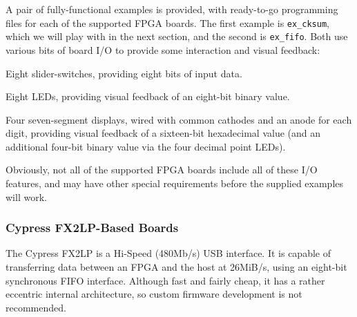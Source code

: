 A pair of fully-functional examples is provided, with ready-to-go programming files for each of the supported FPGA boards. The first example is \texttt{ex\_cksum}, which we will play with in the next section, and the second is \texttt{ex\_fifo}. Both use various bits of board I/O to provide some interaction and visual feedback:

\begin{blobs}
  \item
    Eight slider-switches, providing eight bits of input data.
  \item
    Eight LEDs, providing visual feedback of an eight-bit binary value.
  \item
    Four seven-segment displays, wired with common cathodes and an anode for each digit, providing visual feedback of a sixteen-bit hexadecimal value (and an additional four-bit binary value via the four decimal point LEDs).
\end{blobs}

Obviously, not all of the supported FPGA boards include all of these I/O features, and may have other special requirements before the supplied examples will work.

\subsubsection{Cypress FX2LP-Based Boards}

The Cypress FX2LP is a Hi-Speed (480Mb/s) USB interface. It is capable of transferring data between an FPGA and the host at 26MiB/s, using an eight-bit synchronous FIFO interface. Although fast and fairly cheap, it has a rather eccentric internal architecture, so custom firmware development is not recommended.

